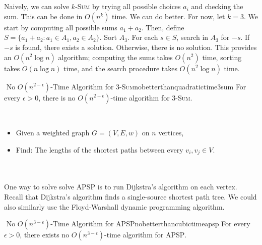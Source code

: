         \vphantom
        \\
        \\
        Naively, we can solve \(k\)-\textsc{Sum} by trying all possible choices \(a_i\) and checking the sum. This can be done in \(O(n^k)\) time. We can do better. For now, let \(k=3\). We start by computing all possible sums \(a_1+a_2\). Then, define \(S=\{a_1+a_2:a_1\in A_1,a_2\in A_2\}\). Sort \(A_3\). For each \(s\in S\), search in \(A_3\) for \(-s\). If \(-s\) is found, there exists a solution. Otherwise, there is no solution. This provides an \(O(n^2\log n)\) algorithm; computing the sums takes \(O(n^2)\) time, sorting takes \(O(n\log n)\) time, and the search procedure takes \(O(n^2\log n)\) time. 
        \begin{hypothesis}{\Stop\,\,No \(O(n^{2-\epsilon})\)-Time Algorithm for \(3\)-\textsc{Sum}}{nobetterthanquadratictime3sum}
            For every \(\epsilon>0\), there is no \(O\left(n^{2-\epsilon}\right)\)-time algorithm for \(3\)-\textsc{Sum}.
        \end{hypothesis}
        \begin{compprob} \label{prob:apsp}
            \vphantom
            \\
            \begin{itemize}
                \item Given a weighted graph \(G=(V,E,w)\) on \(n\) vertices,
                \item Find: The lengths of the shortest paths between every \(v_i,v_j\in V\).
            \end{itemize}
        \end{compprob}
        \vphantom
        \\
        \\
        One way to solve solve \textsc{APSP} is to run Dijkstra's algorithm on each vertex. Recall that Dijkstra's algorithm finds a single-source shortest path tree. We could also similarly use the Floyd-Warshall dynamic programming algorithm.
        \begin{hypothesis}{\Stop\,\,No \(O(n^{3-\epsilon})\)-Time Algorithm for \textsc{APSP}}{nobetterthancubictimeapsp}
            For every \(\epsilon>0\), there exists no \(O(n^{3-\epsilon})\)-time algorithm for \textsc{APSP}.
        \end{hypothesis}